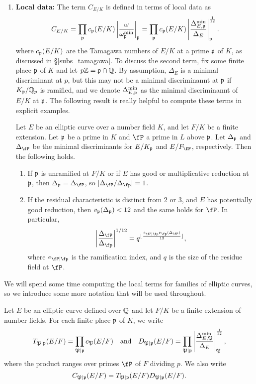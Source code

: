 \begin{enumerate}
    \item \textbf{Local data:} The term $C_{E/K}$ is defined in terms of local data as 
    \begin{equation}\label{fudge-factor}
    C_{E/K}=\prod_{\mathfrak{p}}c_{\mathfrak{p}}(E/K)\left|\frac{\omega}{\omega_{\mathfrak{p}}^{\min}}\right|_{\mathfrak{p}}=\prod_{\mathfrak{p}}c_{\mathfrak{p}}(E/K)\left|\frac{\Delta_{E,\mathfrak{p}}^{\min}}{\Delta_E}\right|_{\mathfrak{p}}^{\frac{1}{12}}.
    \end{equation}
    where $c_{\mathfrak{p}}(E/K)$ are the Tamagawa numbers of $E/K$ at a prime $\mathfrak{p}$ of $K$, as discussed in \S\ref*{subs_tamagawa}. To discuss the second term, fix some finite place $\mathfrak{p}$ of $K$ and let $p\mathbb{Z}=\mathfrak{p}\cap\mathbb{Q}$. By assumption, $\Delta_E$ is a minimal discriminant at $p$, but this may not be a minimal discriminannt at $\mathfrak{p}$ if $K_{\mathfrak{p}}/\mathbb{Q}_p$ is ramified, and we denote $\Delta_{E,\mathfrak{p}}^{\min}$ as the minimal discriminannt of $E/K$ at $\mathfrak{p}$. The following result is really helpful to compute these terms in explicit examples.
    
    \begin{lemma}\label{lem_Dterms}
        Let $E$ be an elliptic curve over a number field $K$, and let $F/K$ be a finite extension. Let $\mathfrak{p}$ be a prime in $K$ and $\fP$ a prime in $L$ above $\mathfrak{p}$. Let $\Delta_{\mathfrak{p}}$ and $\Delta_\fP$ be the minimal discriminants for $E/K_{\mathfrak{p}}$ and $E/F_\fP$, respectively. Then the following holds.
        \begin{enumerate}
            \item If $\mathfrak{p}$ is unramified at $F/K$ or if $E$ has good or multiplicative reduction at $\mathfrak{p}$, then $\Delta_\pp=\Delta_\fP$, so $|\Delta_\fP/\Delta_\fp|=1$.
            \item If the residual characteristic is distinct from $2$ or $3$, and $E$ has potentially good reduction, then $v_{\mathfrak{p}}(\Delta_{\mathfrak{p}})<12$ and the same holds for $\fP$. In particular, 
            $$\left|\frac{\Delta_\fP}{\Delta_\fp}\right|^{1/12}=q^{\floor{\frac{e_{\fP\mid\fp}\nu_\fp(\Delta_\fP)}{12}}},$$
            where $e_{\fP\mid\fp}$ is the ramification index, and $q$ is the size of the residue field at $\fP$.
        \end{enumerate}
    \end{lemma}

\end{enumerate}

We will spend some time computing the local terms for families of elliptic curves, so we introduce some more notation that will be used throughout. 

\begin{notation}\label{not_contr}
    Let $E$ be an elliptic curve defined over $\mathbb{Q}$ and let $F/K$ be a finite extension of number fields. For each finite place $\mathfrak{p}$ of $K$, we write 
    $$T_{\mathfrak{P}\mid\mathfrak{p}}(E/F)=\prod_{\mathfrak{P}\mid\mathfrak{p}}c_\mathfrak{P}(E/F)\quad\text{and}\quad D_{\mathfrak{P}\mid\mathfrak{p}}(E/F)=\prod_{\mathfrak{P}\mid\mathfrak{p}}\left|\frac{\Delta_{E,\mathfrak{P}}^{\min}}{\Delta_E}\right|_\mathfrak{P}^{\frac{1}{12}},$$
    where the product ranges over primes $\fP$ of $F$ dividing $p$. We also write 
    $$C_{\mathfrak{P}\mid \mathfrak{p}}(E/F)=T_{\mathfrak{P}\mid \mathfrak{p}}(E/F)D_{\mathfrak{P}\mid \mathfrak{p}}(E/F).$$
\end{notation}

